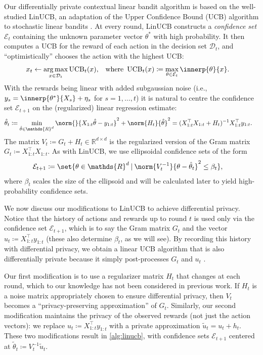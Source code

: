 \documentclass{article}
\newcommand{\defeq}{\coloneq}
\newcommand{\inv}[1]{#1^{-1}}
\newcommand{\Real}{\mathds{R}}
\newcommand{\UCB}{\operatorname{UCB}}
\DeclareMathOperator*{\argmax}{arg\,max}
\newcommand\given[1][\delimsize]{%
  \providecommand{\delimsize}{}
  \nonscript\:#1\vert\allowbreak\nonscript\:\mathopen{}
}
\newcommand{\E}{\mathcal{E}}
\providecommand\transp{\top}
\let\transpsymbol\transp
\renewcommand{\transp}[1]{#1^\transpsymbol}
\newcommand{\Dset}[1]{\mathcal{D}_{#1}}
\begin{document}
Our differentially private contextual linear bandit algorithm is based
on the well-studied LinUCB, an adaptation of the Upper Confidence
Bound (UCB) algorithm to stochastic linear bandits
\citep{DaniStochasticLinearOptimization2008,RusmevichientongLinearlyParameterizedBandits2010,AbbasiYadkoriImprovedAlgorithmsLinear2011}.
At every round, LinUCB constructs a \emph{confidence set} $\E_t$
containing the unknown parameter vector $\theta^*$ with high
probability.  It then computes a UCB for the reward of each action in
the decision set $\Dset{t}$, and ``optimistically'' chooses the action
with the highest UCB:
\begin{align}\label{eq:def-ucb}
  x_t &\gets \argmax_{x\in\Dset{t}} \UCB_t(x),
  &\text{where }
  \UCB_t(x) &\defeq \max_{\theta\in\E_t} \innerp{\theta}{x}.
\end{align}
With the rewards being linear with added subgaussian noise (i.e.,
$y_s = \innerp{\theta^*}{X_s} + \eta_s$ for $s=1,\dotsc,t$) it is
natural to centre the confidence set $\E_{t+1}$ on the (regularized)
linear regression estimate:
\begin{align*}
  \hat\theta_t &\defeq \min_{\hat\theta \in \Real^d} \norm{}{X_{1:t}\hat\theta - y_{1:t}}^2 + \norm{H_t}{\hat\theta}^2
  = \inv{(\transp{X_{1:t}}X_{1:t} + H_t)}\transp{X_{1:t}}y_{1:t}.
\end{align*}
The matrix $V_t \defeq G_t + H_t \in \Real^{d\times d}$ is the regularized
version of the Gram matrix $G_t \defeq \transp{X_{1:t}}X_{1:t}$.  As
with LinUCB, we use ellipsoidal confidence sets of the form
\begin{align}\label{eq:def-ellip}
  \E_{t+1} &\defeq \set{\theta\in\Real^d \given \norm{\inv{V_t}}{\theta-\hat\theta_t}^2 \le \beta_t},
\end{align}
where $\beta_t$ scales the size of the ellipsoid and will be calculated
later to yield high-probability confidence sets.

We now discuss our modifications to LinUCB to achieve differential
privacy.  Notice that the history of actions and rewards up to round
$t$ is used only via the confidence set $\E_{t+1}$, which is to say
the Gram matrix $G_t$ and the vector
$u_t \defeq \transp{X_{1:t}}y_{1:t}$ (these also determine $\beta_t$,
as we will see).  By recording this history with differential privacy,
we obtain a linear UCB algorithm that is also differentially private
because it simply post-processes $G_t$ and $u_t$
\citep[see][Proposition~2.1]{DworkAlgorithmicFoundationsDifferential2014}.

Our first modification is to use a regularizer matrix $H_t$ that
changes at each round, which to our knowledge has not been considered
in previous work.  If $H_t$ is a noise matrix appropriately chosen to
ensure differential privacy, then $V_t$ becomes a ``privacy-preserving
approximation'' of $G_t$.  Similarly, our second modification
maintains the privacy of the observed rewards (not just the action
vectors): we replace $u_t \defeq \transp{X_{1:t}}y_{1:t}$ with a
private approximation $\tilde u_t = u_t + h_t$.  These two
modifications result in \cref{alg:linucb}, with confidence sets
$\E_{t+1}$ centered at $\tilde\theta_t \defeq \inv{V_t} \tilde u_t$.
\end{document}
